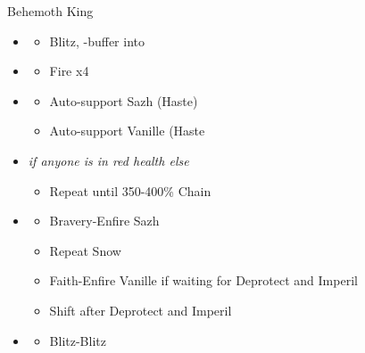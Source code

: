 \begin{multicols}{2}
\begin{battle}{Behemoth King}
\begin{itemize}
    \item \second
    \begin{itemize}
        \item Blitz, \rav-buffer into
    \end{itemize}
    \item \sixth
    \begin{itemize}
        \item Fire x4
    \end{itemize}
    \item \fourth
    \begin{itemize}
        \item Auto-support Sazh (Haste)
        \item Auto-support Vanille (Haste
    \end{itemize}
    \item \fifth \textit{if anyone is in red health else} \sixth
    \begin{itemize}
        \item Repeat until 350-400\% Chain
    \end{itemize}
    \item \third
    \begin{itemize}
        \item Bravery-Enfire Sazh
        \item Repeat Snow
        \item Faith-Enfire Vanille if waiting for Deprotect and Imperil
        \item Shift after Deprotect and Imperil
    \end{itemize}
    \item \second
    \begin{itemize}
        \item Blitz-Blitz
    \end{itemize}
\end{itemize}
\end{battle}
\vfill


\end{multicols}
